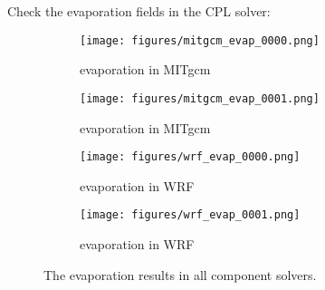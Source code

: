 
Check the evaporation fields in the CPL solver:

\begin{figure}[h!]
\centering
  \begin{subfigure}[b]{0.45\linewidth}
  \texttt{[image: figures/mitgcm\_evap\_0000.png]}
  \caption{evaporation in MITgcm}
  \end{subfigure}
  \begin{subfigure}[b]{0.45\linewidth}
  \texttt{[image: figures/mitgcm\_evap\_0001.png]}
  \caption{evaporation in MITgcm}
  \end{subfigure}
  \hspace{0.1in}
  \begin{subfigure}[b]{0.45\linewidth}
  \texttt{[image: figures/wrf\_evap\_0000.png]}
  \caption{evaporation in WRF}
  \end{subfigure}
  \begin{subfigure}[b]{0.45\linewidth}
  \texttt{[image: figures/wrf\_evap\_0001.png]}
  \caption{evaporation in WRF}
  \end{subfigure}
\caption{The evaporation results in all component solvers.}
\label{fig:evap}
\end{figure}

